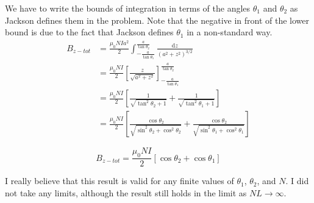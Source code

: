 \documentclass[10pt,a4paper]{article}
\begin{document}
We have to write the bounds of integration in terms of the angles $\theta_1$ and $\theta_2$ as Jackson defines them in the problem.  Note that the negative in front of the lower bound is due to the fact that Jackson defines $\theta_1$ in a non-standard way.
\begin{align}
B_{z-tot}&=\frac{\mu_0NIa^2}{2}\int_{-\frac{a}{\tan\theta_1}}^{\frac{a}{\tan\theta_2}}\frac{\mathrm{d}z}{(a^2+z^2)^{3/2}} \\
&=\frac{\mu_0NI}{2}\left[\frac{z}{\sqrt{a^2+z^2}}\right]_{-\frac{a}{\tan\theta_1}}^{\frac{a}{\tan\theta_2}} \\
&=\frac{\mu_0NI}{2}\left[\frac{1}{\sqrt{\tan^2\theta_2+1}}+\frac{1}{\sqrt{\tan^2\theta_1+1}}\right] \\
&=\frac{\mu_0NI}{2}\left[\frac{\cos\theta_2}{\sqrt{\sin^2\theta_2+\cos^2\theta_2}}+\frac{\cos\theta_2}{\sqrt{\sin^2\theta_1+\cos^2\theta_1}}\right]
\end{align}

\begin{equation}\boxed{
B_{z-tot}=\frac{\mu_0NI}{2}[\cos\theta_2+\cos\theta_1]
}\end{equation}

I really believe that this result is valid for any finite values of $\theta_1$, $\theta_2$, and $N$.  I did not take any limits, although the result still holds in the limit as $NL \rightarrow \infty$.
\end{document}
